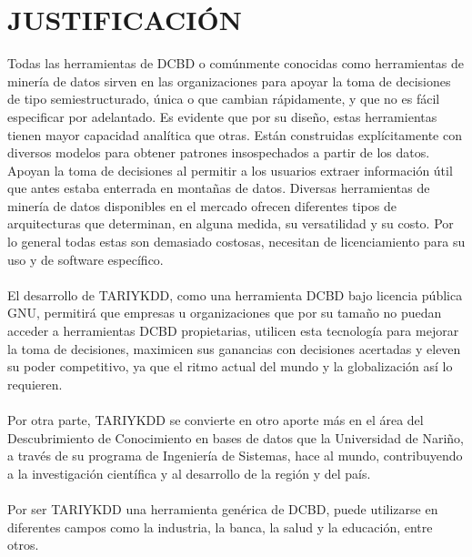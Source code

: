 \chapter{JUSTIFICACI\'ON}
Todas las herramientas de DCBD o com\'unmente conocidas como herra\-mientas de miner\'ia de datos sirven en las organizaciones para apoyar la toma de decisiones de tipo semiestructurado, \'unica o que cambian r\'apidamente, y que no es f\'acil especificar por adelantado. Es evidente que por su dise\~no, estas herramientas tienen mayor capacidad anal\'itica que otras. Est\'an construidas expl\'icitamente con diversos modelos para obtener patrones insospechados a partir de los datos. Apoyan la toma de decisiones al permitir a los usuarios extraer informaci\'on \'util que antes estaba enterrada en monta\~nas de datos. Diversas herramientas de miner\'ia de datos disponibles en el mercado ofrecen diferentes tipos de arquitecturas que determinan, en alguna medida, su versatilidad y su costo. Por lo general todas estas son demasiado costosas, necesitan de licenciamiento para su uso y de software espec\'ifico.\\
\\
El desarrollo de TARIYKDD, como una herramienta DCBD bajo licencia p\'ublica GNU, permitir\'a que empresas u organizaciones que por su tama\~no no puedan acceder a herramientas DCBD propietarias, utilicen esta tecnolog\'ia para mejorar la toma de decisiones, maximicen sus ganancias con decisiones acertadas y eleven su poder competitivo, ya que el ritmo actual del mundo y la globalizaci\'on as\'i lo requieren.\\
\\
Por otra parte, TARIYKDD se convierte en otro aporte m\'as en el \'area del Descubrimiento de Conocimiento en bases de datos que la Universidad de Nari\~no, a trav\'es de su programa de Ingenier\'ia de Sistemas, hace al mundo, contribuyendo a la investigaci\'on cient\'ifica y al desarrollo de la regi\'on y del pa\'is.\\
\\
Por ser TARIYKDD una herramienta gen\'erica de DCBD, puede utilizarse en diferentes campos como la industria, la banca, la salud y la educaci\'on, entre otros.